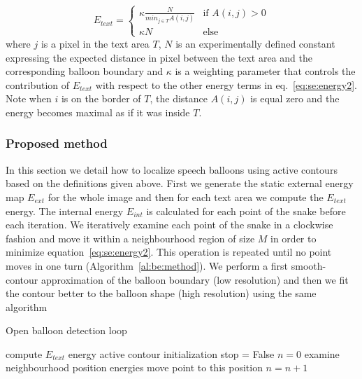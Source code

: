 \begin{equation}\label{eq:se:know}
E_{text} = \begin{cases} \kappa \frac{N}{min_{j \in T} A(i,j)} & \mbox{if } A(i,j) > 0 \\ \kappa N & \mbox{else} \end{cases}
\end{equation}
where $j$ is a pixel in the text area $T$, $N$ is an experimentally defined constant expressing the expected distance in pixel between the text area and the corresponding balloon boundary and $\kappa$ is a weighting parameter that controls the contribution of $E_{text}$ with respect to the other energy terms in eq.~\ref{eq:se:energy2}. Note when $i$ is on the border of $T$, the distance $A(i,j)$ is equal zero and the energy becomes maximal as if it was inside $T$.


\subsubsection{Proposed method}
\label{sec:proposed_method}

In this section we detail how to localize speech balloons using active contours based on the definitions given above. 
First we generate the static external energy map $E_{ext}$ for the whole image and then for each text area we compute the $E_{text}$ energy.
The internal energy $E_{int}$ is calculated for each point of the snake before each iteration.
We iteratively examine each point of the snake in a clockwise fashion and move it within a neighbourhood region of size $M$ in order to minimize equation~\ref{eq:se:energy2}.
This operation is repeated until no point moves in one turn (Algorithm~\ref{al:be:method}).
We perform a first smooth-contour approximation of the balloon boundary (low resolution) and then we fit the contour better to the balloon shape (high resolution) using the same algorithm


\begin{algorithm}
\caption{Open balloon detection loop}
\label{al:be:method}
\begin{algorithmic}
  \STATE compute $E_{text}$ energy
  \STATE active contour initialization
  \STATE stop = False
    \STATE $n = 0$
      \STATE examine neighbourhood position energies
		\STATE move point to this position
		\STATE $n=n+1$
      \ENDIF
    \ENDFOR
    \ENDIF
  \ENDWHILE%
\ENDFOR
\end{algorithmic}
\end{algorithm}

